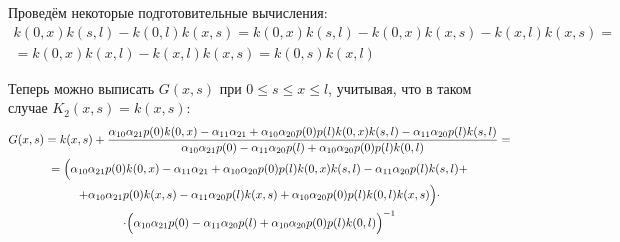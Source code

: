 \documentclass[a4paper,12pt]{article} %
\begin{document}
Проведём некоторые подготовительные вычисления:
\begin{multline}
	k(0, x)k(s, l) - k(0,l) k(x,s)
	=
	k(0, x)k(s, l) - k(0,x) k(x,s) - k(x,l) k(x,s)
	=
	\\=
	k(0, x)k(x, l) - k(x,l) k(x,s)
	=
	k(0, s)k(x, l)
\end{multline}

Теперь можно выписать $G(x,s)$ при $0 \leq s\leq x \leq l$,
учитывая, что в таком случае $K_2(x,s) = k(x,s)$:
\begin{multline}
	G(x,s)
	=
	k(x,s)
	+
	\frac{
		  \alpha_{10} \alpha_{21} p(0) k(0, x)
		- \alpha_{11} \alpha_{21}
		+ \alpha_{10} \alpha_{20} p(0) p(l) k(0, x) k(s, l)
		- \alpha_{11} \alpha_{20} p(l) k(s,l)
	}{
		\alpha_{10}\alpha_{21}p(0)  - \alpha_{11}\alpha_{20}p(l) + \alpha_{10}\alpha_{20} p(0) p(l) k(0,l)
	}
	=
	\\=
	\Bigl(
		  \alpha_{10} \alpha_{21} p(0) k(0, x)
		- \alpha_{11} \alpha_{21}
		+ \alpha_{10} \alpha_{20} p(0) p(l) k(0, x) k(s, l)
		- \alpha_{11} \alpha_{20} p(l) k(s, l)
		+ \\
		+ \alpha_{10} \alpha_{21} p(0) k(x, s)
		- \alpha_{11} \alpha_{20} p(l) k(x, s)
		+ \alpha_{10} \alpha_{20} p(0) p(l) k(0,l) k(x,s)
	\Bigr)\cdot \\ \cdot \Bigl(
		\alpha_{10}\alpha_{21}p(0)  - \alpha_{11}\alpha_{20}p(l) + \alpha_{10}\alpha_{20} p(0) p(l) k(0,l)
	\Bigr)^{-1}
\end{multline}
\end{document}
